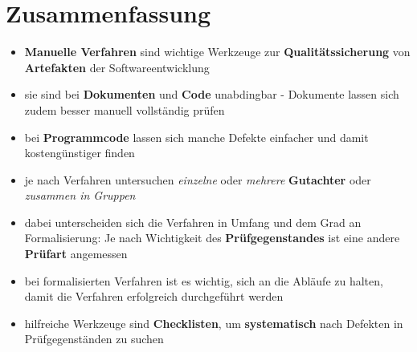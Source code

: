 \section{Zusammenfassung}

\begin{itemize}
    \item \textbf{Manuelle Verfahren} sind wichtige Werkzeuge zur \textbf{Qualitätssicherung} von \textbf{Artefakten} der Softwareentwicklung
    \item sie sind bei \textbf{Dokumenten} und \textbf{Code} unabdingbar - Dokumente lassen sich zudem besser manuell vollständig prüfen
    \item bei \textbf{Programmcode} lassen sich manche Defekte einfacher und damit kostengünstiger finden
    \item je nach Verfahren untersuchen \textit{einzelne} oder \textit{mehrere} \textbf{Gutachter} oder \textit{zusammen in Gruppen}
    \item dabei unterscheiden sich die Verfahren in Umfang und dem Grad an Formalisierung: Je nach Wichtigkeit des \textbf{Prüfgegenstandes} ist eine andere \textbf{Prüfart} angemessen
    \item bei formalisierten Verfahren ist es wichtig, sich an die Abläufe zu halten, damit die Verfahren erfolgreich durchgeführt werden
    \item hilfreiche Werkzeuge sind \textbf{Checklisten}, um \textbf{systematisch} nach Defekten in Prüfgegenständen
    zu suchen
\end{itemize}